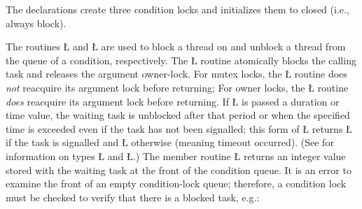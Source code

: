 \documentclass[openright,twoside]{report}
\begin{document}
%
%
%
%
The declarations create three condition locks and initializes them to closed (i.e., always block).

The routines \LGinlinetrue\LGbegin\lgrinde\L{}\endlgrinde\LGend{} and \LGinlinetrue\LGbegin\lgrinde\L{}\endlgrinde\LGend{} are used to block a thread on and unblock a thread from the queue of a condition, respectively.
The \LGinlinetrue\LGbegin\lgrinde\L{}\endlgrinde\LGend{} routine atomically blocks the calling task and releases the argument owner-lock.
For mutex locks, the \LGinlinetrue\LGbegin\lgrinde\L{}\endlgrinde\LGend{} routine does \emph{not} reacquire its argument lock before returning;
For owner locks, the \LGinlinetrue\LGbegin\lgrinde\L{}\endlgrinde\LGend{} routine \emph{does} reacquire its argument lock before returning.
If \LGinlinetrue\LGbegin\lgrinde\L{}\endlgrinde\LGend{} is passed a duration or time value, the waiting task is unblocked after that period or when the specified time is exceeded even if the task has not been signalled;
this form of \LGinlinetrue\LGbegin\lgrinde\L{}\endlgrinde\LGend{} returns \LGinlinetrue\LGbegin\lgrinde\L{}\endlgrinde\LGend{} if the task is signalled and \LGinlinetrue\LGbegin\lgrinde\L{}\endlgrinde\LGend{} otherwise (meaning timeout occurred).
(See  for information on types \LGinlinetrue\LGbegin\lgrinde\L{}\endlgrinde\LGend{} and \LGinlinetrue\LGbegin\lgrinde\L{}\endlgrinde\LGend{}.)
The member routine \LGinlinetrue\LGbegin\lgrinde\L{}\endlgrinde\LGend{} returns an integer value stored with the waiting task at the front of the condition queue.
It is an error to examine the front of an empty condition-lock queue;
therefore, a condition lock must be checked to verify that there is a blocked task, e.g.:
\end{document}
